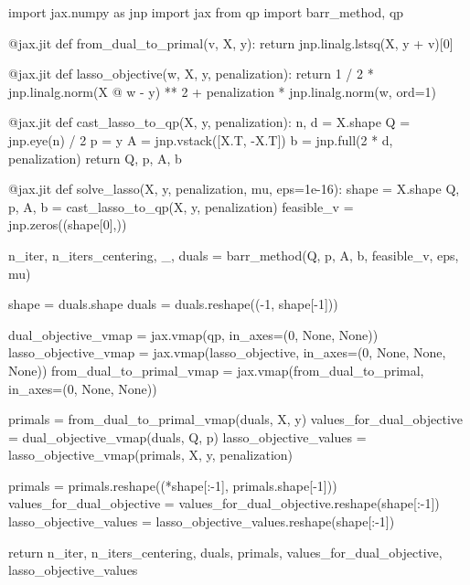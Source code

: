 \documentclass{article}
\begin{document}
\begin{python}
import jax.numpy as jnp
import jax
from qp import barr_method, qp


@jax.jit
def from_dual_to_primal(v, X, y):
    return jnp.linalg.lstsq(X, y + v)[0]


@jax.jit
def lasso_objective(w, X, y, penalization):
    return 1 / 2 * jnp.linalg.norm(X @ w - y) ** 2 + penalization * jnp.linalg.norm(w, ord=1)


@jax.jit
def cast_lasso_to_qp(X, y, penalization):
    n, d = X.shape
    Q = jnp.eye(n) / 2
    p = y
    A = jnp.vstack([X.T, -X.T])
    b = jnp.full(2 * d, penalization)
    return Q, p, A, b


@jax.jit
def solve_lasso(X, y, penalization, mu, eps=1e-16):
    shape = X.shape
    Q, p, A, b = cast_lasso_to_qp(X, y, penalization)
    feasible_v = jnp.zeros((shape[0],))

    n_iter, n_iters_centering, _, duals = barr_method(Q, p, A, b, feasible_v, eps, mu)

    shape = duals.shape
    duals = duals.reshape((-1, shape[-1]))

    dual_objective_vmap = jax.vmap(qp, in_axes=(0, None, None))
    lasso_objective_vmap = jax.vmap(lasso_objective, in_axes=(0, None, None, None))
    from_dual_to_primal_vmap = jax.vmap(from_dual_to_primal, in_axes=(0, None, None))

    primals = from_dual_to_primal_vmap(duals, X, y)
    values_for_dual_objective = dual_objective_vmap(duals, Q, p)
    lasso_objective_values = lasso_objective_vmap(primals, X, y, penalization)

    primals = primals.reshape((*shape[:-1], primals.shape[-1]))
    values_for_dual_objective = values_for_dual_objective.reshape(shape[:-1])
    lasso_objective_values = lasso_objective_values.reshape(shape[:-1])

    return n_iter, n_iters_centering, duals, primals, values_for_dual_objective, lasso_objective_values
\end{python}
\end{document}
